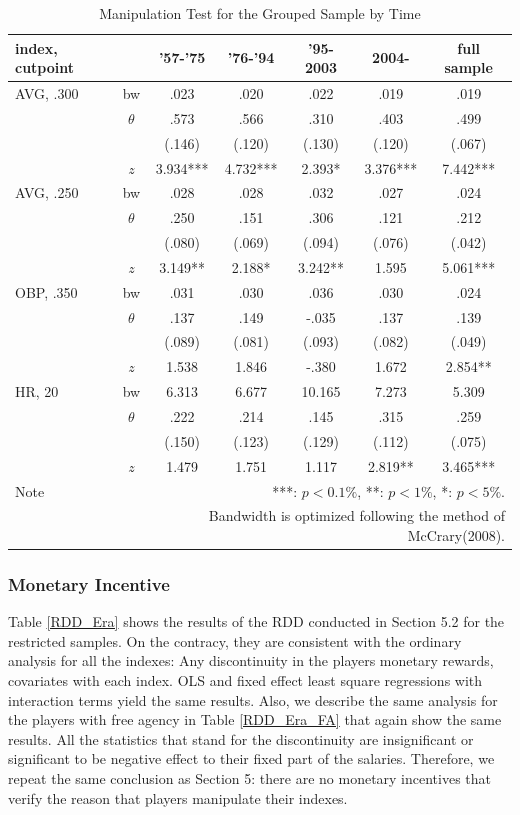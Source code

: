 \documentclass[dvipdfmx, 12pt]{article}
\begin{document}
\begin{table}[H]
  \centering
  \caption{Manipulation Test for the Grouped Sample by Time}
  \label{Mani-Era}
  \footnotesize
  \begin{tabular}{lcccccc} \hline
    index, cutpoint &  & '57-'75 &'76-'94 & '95-2003 & 2004- &full sample \\ \hline \hline
    AVG, .300 & bw & .023 & .020 & .022 & .019 & .019 \\
    & $\theta$ & .573 & .566 & .310 & .403 & .499 \\
    & & (.146) & (.120) & (.130) & (.120) & (.067) \\
    & $z$ & 3.934*** & 4.732*** & 2.393* & 3.376*** & 7.442*** \\ \hline
    AVG, .250 & bw & .028 & .028 & .032 & .027 & .024 \\
    & $\theta$ & .250 & .151 & .306 & .121 & .212 \\
    & & (.080) & (.069) & (.094)& (.076) & (.042) \\
    & $z$ & 3.149** & 2.188* & 3.242** & 1.595 & 5.061*** \\ \hline
    OBP, .350 & bw & .031 & .030 & .036 & .030 & .024 \\
    & $\theta$ & .137 & .149 & -.035 & .137 & .139 \\
    & & (.089) & (.081) & (.093) & (.082) & (.049) \\
    & $z$ & 1.538 & 1.846 & -.380 & 1.672 & 2.854** \\ \hline
    HR, 20 & bw & 6.313 & 6.677 & 10.165 & 7.273 & 5.309 \\
    & $\theta$ & .222 & .214 & .145 & .315 & .259 \\
    & & (.150) & (.123) & (.129) & (.112) & (.075) \\
    & $z$ & 1.479 & 1.751 & 1.117 & 2.819** & 3.465*** \\ \hline
    Note & \multicolumn{6}{r}{
    ***: $p<0.1\%$, **: $p<1\%$, *: $p<5\%$.
    }\\
    & \multicolumn{6}{r}{
    Bandwidth is optimized following the method of McCrary(2008).
    }
  \end{tabular}
\end{table}

\subsubsection{Monetary Incentive}

Table \ref{RDD_Era} shows the results of the RDD conducted in Section 5.2 for the restricted samples. On the contracy, they are consistent with the ordinary analysis for all the indexes: Any discontinuity in the players monetary rewards, covariates with each index. OLS and fixed effect least square regressions with interaction terms yield the same results. Also, we describe the same analysis for the players with free agency in Table \ref{RDD_Era_FA} that again show the same results. All the statistics that stand for the discontinuity are insignificant or significant to be negative effect to their fixed part of the salaries. Therefore, we repeat the same conclusion as Section 5: there are no monetary incentives that verify the reason that players manipulate their indexes.
\end{document}
